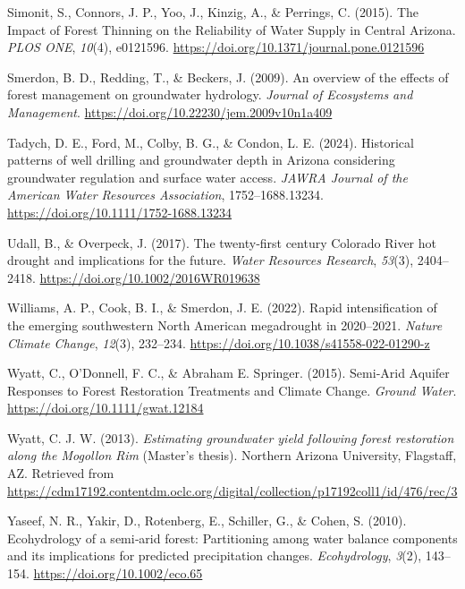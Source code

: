 \documentclass[
]{agujournal2019}
\newlength{\cslhangindent}
\newenvironment{CSLReferences}[2] %
 {\begin{list}{}{%
  \setlength{\itemindent}{0pt}
  \setlength{\leftmargin}{0pt}
  \setlength{\parsep}{0pt}
  \ifodd #1
   \setlength{\leftmargin}{\cslhangindent}
   \setlength{\itemindent}{-1\cslhangindent}
  \fi
  \setlength{\itemsep}{#2\baselineskip}}}
 {\end{list}}
\begin{document}
\begin{CSLReferences}{1}{0}
Simonit, S., Connors, J. P., Yoo, J., Kinzig, A., \& Perrings, C.
(2015). The {Impact} of {Forest} {Thinning} on the {Reliability} of
{Water} {Supply} in {Central} {Arizona}. \emph{PLOS ONE}, \emph{10}(4),
e0121596. \url{https://doi.org/10.1371/journal.pone.0121596}

Smerdon, B. D., Redding, T., \& Beckers, J. (2009). An overview of the
effects of forest management on groundwater hydrology. \emph{Journal of
Ecosystems and Management}.
\url{https://doi.org/10.22230/jem.2009v10n1a409}

Tadych, D. E., Ford, M., Colby, B. G., \& Condon, L. E. (2024).
Historical patterns of well drilling and groundwater depth in {Arizona}
considering groundwater regulation and surface water access. \emph{JAWRA
Journal of the American Water Resources Association}, 1752--1688.13234.
\url{https://doi.org/10.1111/1752-1688.13234}

Udall, B., \& Overpeck, J. (2017). The twenty‐first century {Colorado}
{River} hot drought and implications for the future. \emph{Water
Resources Research}, \emph{53}(3), 2404--2418.
\url{https://doi.org/10.1002/2016WR019638}

Williams, A. P., Cook, B. I., \& Smerdon, J. E. (2022). Rapid
intensification of the emerging southwestern {North} {American}
megadrought in 2020--2021. \emph{Nature Climate Change}, \emph{12}(3),
232--234. \url{https://doi.org/10.1038/s41558-022-01290-z}

Wyatt, C., O'Donnell, F. C., \& Abraham E. Springer. (2015). Semi‐{Arid}
{Aquifer} {Responses} to {Forest} {Restoration} {Treatments} and
{Climate} {Change}. \emph{Ground Water}.
\url{https://doi.org/10.1111/gwat.12184}

Wyatt, C. J. W. (2013). \emph{Estimating groundwater yield following
forest restoration along the {Mogollon} {Rim}} (Master's thesis).
Northern Arizona University, Flagstaff, AZ. Retrieved from
\url{https://cdm17192.contentdm.oclc.org/digital/collection/p17192coll1/id/476/rec/3}

Yaseef, N. R., Yakir, D., Rotenberg, E., Schiller, G., \& Cohen, S.
(2010). Ecohydrology of a semi‐arid forest: Partitioning among water
balance components and its implications for predicted precipitation
changes. \emph{Ecohydrology}, \emph{3}(2), 143--154.
\url{https://doi.org/10.1002/eco.65}


\end{CSLReferences}
\end{document}
